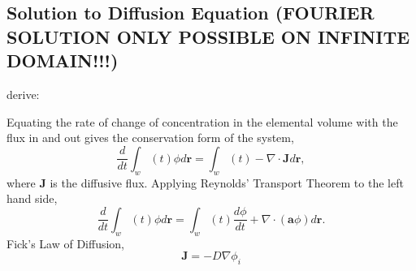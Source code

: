 
\subsection{Solution to Diffusion Equation (FOURIER SOLUTION ONLY POSSIBLE ON INFINITE DOMAIN!!!)}


derive:


Equating the rate of change of concentration in the elemental volume with the flux in and out gives the conservation form of the system,
%
\begin{equation}
\frac{d}{dt} \int_w(t) \phi d\bm{r}  = \int_w(t) - \nabla \cdot \bm{J} d \bm{r},
\end{equation}
%
where $\bm{J}$ is the diffusive flux. Applying Reynolds' Transport Theorem \cite{acheson1990elementary} to the left hand side,
%
\begin{equation}
\frac{d}{dt} \int_w(t) \phi d\bm{r} = \int_w(t) \frac{d\phi}{dt} + \nabla \cdot (\bm{a}\phi) d \bm{r}.
\end{equation}
%
Fick's Law of Diffusion,
%
\begin{equation}
\bm{J} = - D\nabla \phi_i
\end{equation}



